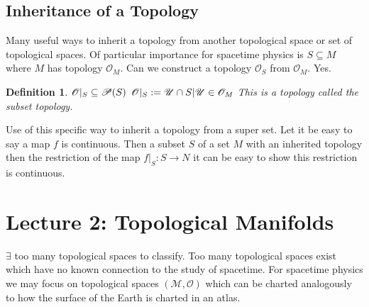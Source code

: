 \documentclass[10pt, oneside]{article}
\newcommand{\M}{\mathcal{M}}
\newtheorem{defn}{Definition}
\begin{document}
  \subsection{Inheritance of a Topology}
     Many useful ways to inherit a topology from another topological space or set of topological spaces. Of particular importance for spacetime physics is $S \subseteq M$ where $M$ has topology $\mathcal{O}_M$.
     Can we construct a topology $\mathcal{O}_S$ from $\mathcal{O}_M$. Yes.
     \begin{defn}
        $\mathcal{O} |_S \subseteq \mathcal{P}(S) \\$
        $\mathcal{O}|_S := {\mathcal{U} \cap S | \mathcal{U} \in \mathcal{O}_M} \\$
        This is a topology called the subset topology.
     \end{defn}
     Use of this specific way to inherit a topology from a super set. Let it be easy to say a map $f$ is continuous. Then a subset $S$ of a set $M$ with an inherited topology then the restriction of the map $f|_S: S \to N$ it can be easy to show this restriction is continuous.
\section{Lecture 2: Topological Manifolds}
     $\exists$ too many topological spaces to classify. Too many topological spaces exist which have no known connection to the study of spacetime. For spacetime physics we may focus on topological spaces $(\M,\mathcal{O})$ which can be charted analogously to how the surface of the Earth is charted in an atlas.
\end{document}
